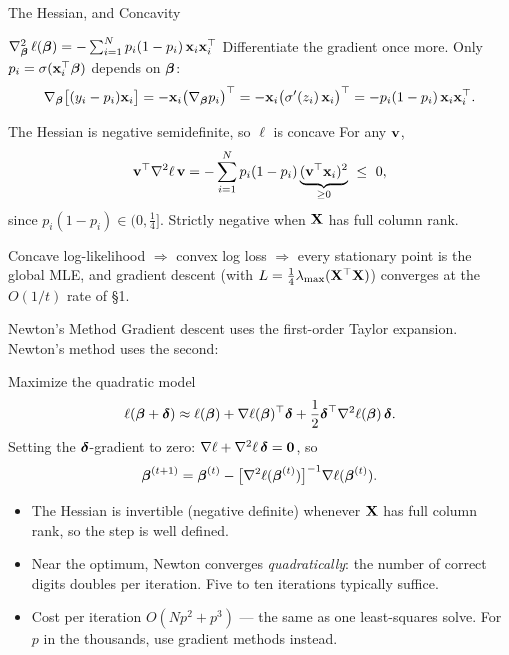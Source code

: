 \documentclass[11pt,aspectratio=169]{beamer}
\begin{document}
\begin{frame}{The Hessian, and Concavity}\small
\begin{derivation}{$\nabla^2_{\boldsymbol{\beta}}\,\ell(\boldsymbol{\beta})=-\sum_{i=1}^Np_i(1-p_i)\,\mathbf{x}_i\mathbf{x}_i^{\top}$}
Differentiate the gradient once more. Only $p_i=\sigma(\mathbf{x}_i^{\top}\boldsymbol{\beta})$ depends on $\boldsymbol{\beta}$:
\[
\nabla_{\boldsymbol{\beta}}\bigl[(y_i-p_i)\mathbf{x}_i\bigr]=-\mathbf{x}_i\bigl(\nabla_{\boldsymbol{\beta}} p_i\bigr)^{\top}
=-\mathbf{x}_i\bigl(\sigma'(z_i)\,\mathbf{x}_i\bigr)^{\top}=-p_i(1-p_i)\,\mathbf{x}_i\mathbf{x}_i^{\top} .
\]
\end{derivation}
\begin{claim}{The Hessian is negative semidefinite, so $\ell$ is concave}
For any $\mathbf{v}$,
\[
\vv\T\nabla^2\ell\,\vv=-\sum_{i=1}^Np_i(1-p_i)\underbrace{(\vv\T\vx_i)^2}_{\ge0}\ \le\ 0,
\]
since $p_i(1-p_i)\in(0,\tfrac14]$. Strictly negative when $\mathbf{X}$ has full column rank.
\end{claim}
\begin{keypoint}
Concave log-likelihood $\Rightarrow$ convex log loss $\Rightarrow$ every stationary point is the global MLE, and
gradient descent (with $L=\tfrac14\lambda_{\max}(\mathbf{X}^{\top}\mathbf{X})$) converges at the $O(1/t)$ rate of \S1.
\end{keypoint}
\end{frame}

\begin{frame}{Newton's Method}\small
Gradient descent uses the first-order Taylor expansion. Newton's method uses the second:
\begin{derivation}{Maximize the quadratic model}
\[
\ell(\boldsymbol{\beta}+\boldsymbol{\delta})\approx\ell(\boldsymbol{\beta})+\nabla\ell(\boldsymbol{\beta})^{\top}\boldsymbol{\delta}+\frac12\boldsymbol{\delta}^{\top}\nabla^2\ell(\boldsymbol{\beta})\,\boldsymbol{\delta} .
\]
Setting the $\boldsymbol{\delta}$-gradient to zero: $\nabla\ell+\nabla^2\ell\,\boldsymbol{\delta}=\mathbf{0}$, so
\[
\boldsymbol{\beta}^{(t+1)}=\boldsymbol{\beta}^{(t)}-\bigl[\nabla^2\ell(\boldsymbol{\beta}^{(t)})\bigr]^{-1}\nabla\ell(\boldsymbol{\beta}^{(t)}).
\]
\end{derivation}
\begin{itemize}
  \item The Hessian is invertible (negative definite) whenever $\mathbf{X}$ has full column rank, so the step is well defined.
  \item Near the optimum, Newton converges \emph{quadratically}: the number of correct digits doubles per iteration.
        Five to ten iterations typically suffice.
  \item Cost per iteration $O(Np^2+p^3)$ --- the same as one least-squares solve. For $p$ in the thousands, use
        gradient methods instead.
\end{itemize}
\end{frame}
\end{document}
